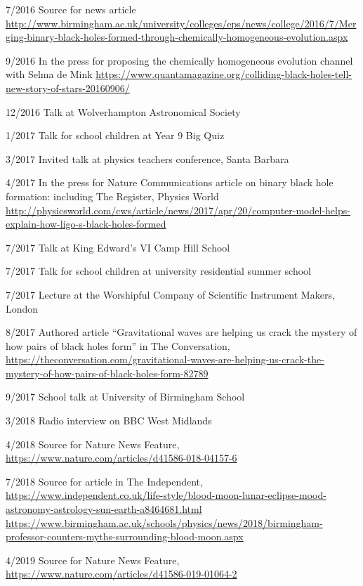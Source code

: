 \documentclass[margin,line]{res}
\begin{document}
\begin{resume}
7/2016 	Source for news article\\ \url{http://www.birmingham.ac.uk/university/colleges/eps/news/college/2016/7/Merging-binary-black-holes-formed-through-chemically-homogeneous-evolution.aspx}

9/2016 	In the press for proposing the chemically homogeneous evolution channel with Selma de Mink \url{https://www.quantamagazine.org/colliding-black-holes-tell-new-story-of-stars-20160906/}

12/2016	Talk at Wolverhampton Astronomical Society

1/2017	Talk for school children at Year 9 Big Quiz

3/2017	Invited talk at physics teachers conference, Santa Barbara

4/2017	In the press for Nature Communications article on binary black hole formation: including The Register, %
Physics World\\ \url{http://physicsworld.com/cws/article/news/2017/apr/20/computer-model-helps-explain-how-ligo-s-black-holes-formed}

7/2017	Talk at King Edward's VI Camp Hill School

7/2017	Talk for school children at university residential summer school

7/2017 	Lecture at the Worshipful Company of Scientific Instrument Makers, London

8/2017	Authored article ``Gravitational waves are helping us crack the mystery of how pairs of black holes form'' in The Conversation,\\ 
\url{https://theconversation.com/gravitational-waves-are-helping-us-crack-the-mystery-of-how-pairs-of-black-holes-form-82789}

9/2017	School talk at University of Birmingham School

3/2018	Radio interview on BBC West Midlands

4/2018	Source for Nature News Feature, \url{https://www.nature.com/articles/d41586-018-04157-6}

7/2018 	Source for article in The Independent, \url{https://www.independent.co.uk/life-style/blood-moon-lunar-eclipse-mood-astronomy-astrology-sun-earth-a8464681.html}\\
\url{https://www.birmingham.ac.uk/schools/physics/news/2018/birmingham-professor-counters-myths-surrounding-blood-moon.aspx}

4/2019	Source for Nature News Feature, \url{https://www.nature.com/articles/d41586-019-01064-2}


\end{resume}
\end{document}
